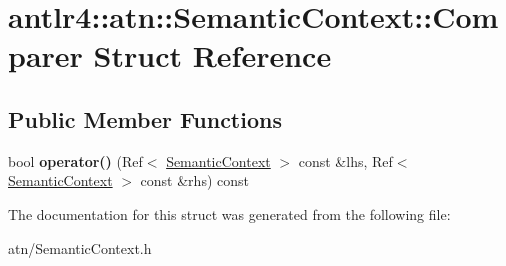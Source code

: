 \hypertarget{structantlr4_1_1atn_1_1SemanticContext_1_1Comparer}{}\section{antlr4\+:\+:atn\+:\+:Semantic\+Context\+:\+:Comparer Struct Reference}
\label{structantlr4_1_1atn_1_1SemanticContext_1_1Comparer}
\subsection*{Public Member Functions}
\begin{DoxyCompactItemize}
\item 
\mbox{\label{structantlr4_1_1atn_1_1SemanticContext_1_1Comparer_a3b881e913bdb47f3e7bcfb833533c3f9}} 
bool {\bfseries operator()} (Ref$<$ \hyperlink{classantlr4_1_1atn_1_1SemanticContext}{Semantic\+Context} $>$ const \&lhs, Ref$<$ \hyperlink{classantlr4_1_1atn_1_1SemanticContext}{Semantic\+Context} $>$ const \&rhs) const
\end{DoxyCompactItemize}


The documentation for this struct was generated from the following file\+:\begin{DoxyCompactItemize}
\item 
atn/Semantic\+Context.\+h\end{DoxyCompactItemize}
